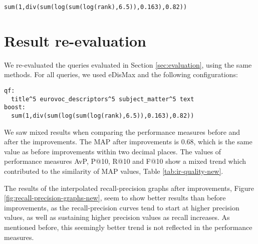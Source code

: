 \documentclass[sigconf, authorversion]{acmart}
\begin{document}
\begin{verbatim}
sum(1,div(sum(log(sum(log(rank),6.5)),0.163),0.82))
\end{verbatim}

\section{Result re-evaluation}

We re-evaluated the queries evaluated in Section \ref{sec:evaluation}, using the same methods. For all queries, we used eDisMax and the following configurations:

\begin{verbatim}
qf:
  title^5 eurovoc_descriptors^5 subject_matter^5 text
boost:
  sum(1,div(sum(log(sum(log(rank),6.5)),0.163),0.82))
\end{verbatim}

We saw mixed results when comparing the performance measures before and after the improvements. The MAP after improvements is 0.68, which is the same value as before improvements within two decimal places. The values of performance measures AvP, P@10, R@10 and F@10 show a mixed trend which contributed to the similarity of MAP values, Table \ref{tab:ir-quality-new}.

The results of the interpolated recall-precision graphs after improvements, Figure \ref{fig:recall-precision-graphs-new}, seem to show better results than before improvements, as the recall-precision curves tend to start at higher precision values, as well as sustaining higher precision values as recall increases. As mentioned before, this seemingly better trend is not reflected in the performance measures.
\end{document}
